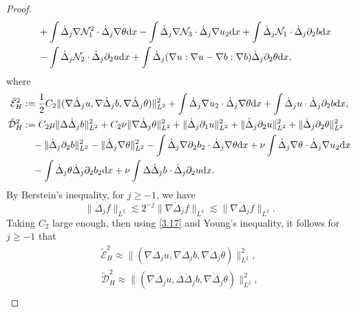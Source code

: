 \documentclass[reqno]{amsart}
\begin{document}
\begin{proof}
\begin{equation}
\begin{aligned}
&\quad +\int\dot{\Delta}_j\nabla \mathcal{N}_1^2\cdot\dot{\Delta}_j\nabla\theta{\rm d}x
 -\int\dot{\Delta}_j\nabla\mathcal{N}_3\cdot\dot{\Delta}_j\nabla u_2{\rm d}x
 +\int\dot{\Delta}_j \mathcal{N}_1\cdot\dot{\Delta}_j\partial_2b{\rm d}x \\
&\quad -\int\dot{\Delta}_j\mathcal{N}_2\cdot\dot{\Delta}_j\partial_2 u{\rm d}x
 +\int\dot{\Delta}_j(\nabla u:\nabla u-\nabla b:\nabla b)
 \dot{\Delta}_j\partial_2\theta{\rm d}x,
\end{aligned}
\end{equation}
where
\begin{gather*}
 \tilde{\mathcal{E}}_H^2
:=\frac{1}{2}C_2\|(\nabla\dot{\Delta}_ju,\nabla\dot{\Delta}_jb,
 \nabla\dot{\Delta}_j\theta)\|_{L^2}^2+\int\dot{\Delta}_j\nabla u_2\cdot
 \dot{\Delta}_j\nabla\theta{\rm d}x+\int\dot{\Delta}_j u\cdot\dot{\Delta}_j
 \partial_2b{\rm d}x,\\
\begin{aligned}
 \tilde{\mathcal{D}}_H^2
&:= C_2\mu\|\Delta\dot{\Delta}_jb\|_{L^2}^2+C_2\nu\|\nabla\dot{\Delta}_j\theta\|_{L^2}^2
 +\|\dot{\Delta}_j\partial_1 u\|_{L^2}^2+\|\dot{\Delta}_j\partial_2 u\|_{L^2}^2
 +\|\dot{\Delta}_j\partial_2\theta\|_{L^2}^2 \\
&\quad -\|\dot{\Delta}_j\partial_2b\|_{L^2}^2
 -\|\dot{\Delta}_j\nabla \theta\|_{L^2}^2
 -\int\dot{\Delta}_j\nabla\partial_2b_2\cdot\dot{\Delta}_j\nabla\theta{\rm d}x
 +\nu\int\dot{\Delta}_j\nabla\theta\cdot\dot{\Delta}_j\nabla u_2{\rm d}x \\
 &\quad -\int\dot{\Delta}_j\theta\dot{\Delta}_j\partial_2b_2{\rm d}x
  +\nu\int\Delta\dot{\Delta}_jb\cdot\dot{\Delta}_j\partial_2 u{\rm d}x.
 \end{aligned}
\end{gather*}
By Berstein's inequality, for $j\geqslant -1$, we have
\begin{equation}\label{3.17}
 \|\dot{\Delta}_jf\|_{L^2}\lesssim2^{-j}\|\nabla\dot{\Delta}_jf\|_{L^2}\lesssim\|\nabla\dot{\Delta}_jf\|_{L^2}.
\end{equation}
Taking $C_2$ large enough, then using \eqref{3.17} and Young's inequality,
it follows for $j\geqslant -1$ that
\begin{equation}\label{3.18}
\begin{gathered}
 \tilde{\mathcal{E}}_H^2\approx\|(\nabla\dot{\Delta}_ju,\nabla\dot{\Delta}_jb,\nabla\dot{\Delta}_j\theta)\|_{L^2}^2, \\
 \tilde{\mathcal{D}}_H^2\approx\|(\nabla\dot{\Delta}_ju,\Delta\dot{\Delta}_jb,\nabla\dot{\Delta}_j\theta)\|_{L^2}^2, \\

\end{gathered}
\end{equation}
\end{proof}
\end{document}
